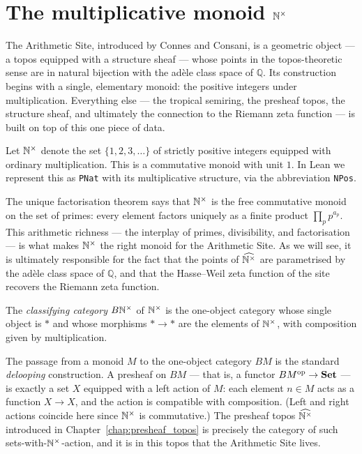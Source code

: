 \chapter{The multiplicative monoid \texorpdfstring{$\mathbb{N}^{\times}$}{N+}}

The Arithmetic Site, introduced by Connes and Consani, is a geometric
object — a topos equipped with a structure sheaf — whose points in the
topos-theoretic sense are in natural bijection with the adèle class space
of $\mathbb{Q}$.  Its construction begins with a single, elementary
monoid: the positive integers under multiplication.  Everything else —
the tropical semiring, the presheaf topos, the structure sheaf, and
ultimately the connection to the Riemann zeta function — is built on top
of this one piece of data.

\begin{definition}[label=def:Nplus]
  \label{def:Nplus}\leanok
  Let $\mathbb{N}^{\times}$ denote the set $\{1, 2, 3, \ldots\}$ of strictly positive
  integers equipped with ordinary multiplication. This is a commutative
  monoid with unit $1$.
  In Lean we represent this as \texttt{PNat} with its multiplicative
  structure, via the abbreviation \texttt{NPos}.
\end{definition}

The unique factorisation theorem says that $\mathbb{N}^{\times}$ is the free
commutative monoid on the set of primes: every element factors uniquely
as a finite product $\prod_p p^{a_p}$.  This arithmetic richness ---
the interplay of primes, divisibility, and factorisation --- is what
makes $\mathbb{N}^{\times}$ the right monoid for the Arithmetic Site.  As we will
see, it is ultimately responsible for the fact that the points of
$\widehat{\mathbb{N}^{\times}}$ are parametrised by the ad\`ele class space of
$\mathbb{Q}$, and that the Hasse--Weil zeta function of the site
recovers the Riemann zeta function.

\begin{definition}[label=def:BNplus, uses=def:Nplus]
  \label{def:BNplus}\leanok
  The \emph{classifying category} $B\mathbb{N}^{\times}$ of $\mathbb{N}^{\times}$ is the
  one-object category whose single object is $*$ and whose morphisms
  $* \to *$ are the elements of $\mathbb{N}^{\times}$, with composition given by
  multiplication.
\end{definition}

\begin{remark}
  The passage from a monoid $M$ to the one-object category $BM$ is the
  standard \emph{delooping} construction.  A presheaf on $BM$ — that is,
  a functor $BM^{\mathrm{op}} \to \mathbf{Set}$ — is exactly a set $X$
  equipped with a left action of $M$: each element $n \in M$ acts as a
  function $X \to X$, and the action is compatible with composition.
  (Left and right actions coincide here since $\mathbb{N}^{\times}$ is commutative.)
  The presheaf topos $\widehat{\mathbb{N}^{\times}}$ introduced in
  Chapter~\ref{chap:presheaf_topos} is precisely the category of such
  sets-with-$\mathbb{N}^{\times}$-action, and it is in this topos that the Arithmetic
  Site lives.
\end{remark}

